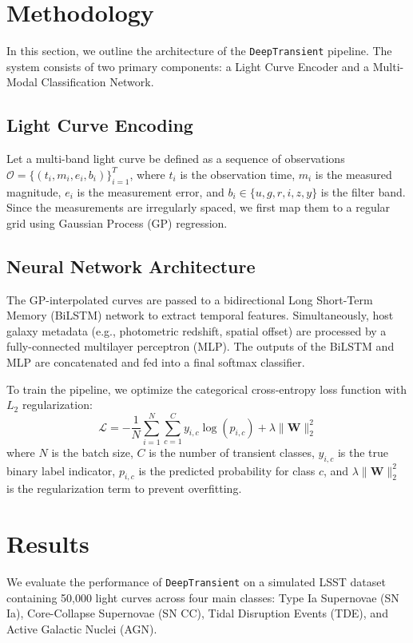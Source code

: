 \documentclass[11pt]{article}
\begin{document}
\section{Methodology}
In this section, we outline the architecture of the \texttt{DeepTransient} pipeline. The system consists of two primary components: a Light Curve Encoder and a Multi-Modal Classification Network.

\subsection{Light Curve Encoding}
Let a multi-band light curve be defined as a sequence of observations $\mathcal{O} = \{(t_i, m_i, e_i, b_i)\}_{i=1}^T$, where $t_i$ is the observation time, $m_i$ is the measured magnitude, $e_i$ is the measurement error, and $b_i \in \{u, g, r, i, z, y\}$ is the filter band. Since the measurements are irregularly spaced, we first map them to a regular grid using Gaussian Process (GP) regression.

\subsection{Neural Network Architecture}
The GP-interpolated curves are passed to a bidirectional Long Short-Term Memory (BiLSTM) network to extract temporal features. Simultaneously, host galaxy metadata (e.g., photometric redshift, spatial offset) are processed by a fully-connected multilayer perceptron (MLP). The outputs of the BiLSTM and MLP are concatenated and fed into a final softmax classifier.

To train the pipeline, we optimize the categorical cross-entropy loss function with $L_2$ regularization:
\begin{equation}
\mathcal{L} = -\frac{1}{N} \sum_{i=1}^{N} \sum_{c=1}^{C} y_{i,c} \log(p_{i,c}) + \lambda \|\mathbf{W}\|^2_2
\label{eq:loss}
\end{equation}
where $N$ is the batch size, $C$ is the number of transient classes, $y_{i,c}$ is the true binary label indicator, $p_{i,c}$ is the predicted probability for class $c$, and $\lambda \|\mathbf{W}\|^2_2$ is the regularization term to prevent overfitting.

\section{Results}
We evaluate the performance of \texttt{DeepTransient} on a simulated LSST dataset containing 50,000 light curves across four main classes: Type Ia Supernovae (SN Ia), Core-Collapse Supernovae (SN CC), Tidal Disruption Events (TDE), and Active Galactic Nuclei (AGN).
\end{document}
